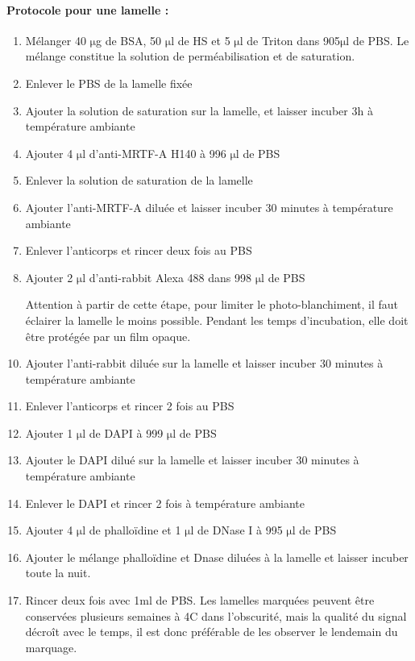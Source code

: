 \documentclass{report}
\newcommand{\micro}{$\mathrm{\mu}$}
\begin{document}
\paragraph{Protocole pour une lamelle : }
\begin{enumerate}
\item Mélanger 40 \micro g de BSA, 50 \micro l de HS et 5 \micro l de Triton dans 905\micro l de PBS. Le mélange constitue la solution de perméabilisation et de saturation.
\item Enlever le PBS de la lamelle fixée
\item Ajouter la solution de saturation sur la lamelle, et laisser incuber 3h à température ambiante
\item Ajouter 4 \micro l d'anti-MRTF-A H140 à 996 \micro l de PBS
\item Enlever la solution de saturation de la lamelle
\item Ajouter l'anti-MRTF-A diluée et laisser incuber 30 minutes à température ambiante
\item Enlever l'anticorps et rincer deux fois au PBS
\item Ajouter 2 \micro l d'anti-rabbit Alexa 488 dans 998 \micro l de PBS
\item[Attention] à partir de cette étape, pour limiter le photo-blanchiment, il faut éclairer la lamelle le moins possible. Pendant les temps d'incubation, elle doit être protégée par un film opaque. 
\item Ajouter l'anti-rabbit diluée sur la lamelle et laisser incuber 30 minutes à température ambiante
\item Enlever l'anticorps et rincer 2 fois au PBS
\item Ajouter 1 \micro l de DAPI à 999 \micro l de PBS
\item Ajouter le DAPI dilué sur la lamelle et laisser incuber 30 minutes à température ambiante
\item Enlever le DAPI et rincer 2 fois à température ambiante
\item Ajouter 4 \micro l de phalloïdine et 1 \micro l de DNase I à 995 \micro l de PBS
\item Ajouter le mélange phalloïdine et Dnase diluées à la lamelle et laisser incuber toute la nuit.
\item Rincer deux fois avec 1ml de PBS. Les lamelles marquées peuvent être conservées plusieurs semaines à 4\degres C dans l'obscurité, mais la qualité du signal décroît avec le temps, il est donc préférable de les observer le lendemain du marquage.

\end{enumerate}
\end{document}
